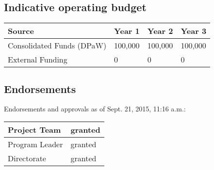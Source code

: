 \documentclass[version=last, paper=a4, DIV=18, usenames, dvipsnames]{scrartcl}
\begin{document}
\subsection*{Indicative operating budget }



\begin{longtabu} to \linewidth { |  X | X | X | X | }
\hline
{}
Source & Year 1 & Year 2 & Year 3\\
\hline
\endhead



Consolidated Funds (DPaW) & 100,000 & 100,000 & 100,000\\



External Funding & 0 & 0 & 0\\


\hline
\end{longtabu}





\subsection*{Endorsements}
Endorsements and approvals as of Sept. 21, 2015, 11:16 a.m.:\\
\begin{tabu} {| X | X |}
\hline

Project Team & granted\\
\hline

Program Leader & granted\\
\hline

Directorate & granted\\
\hline

\end{tabu}
\end{document}
